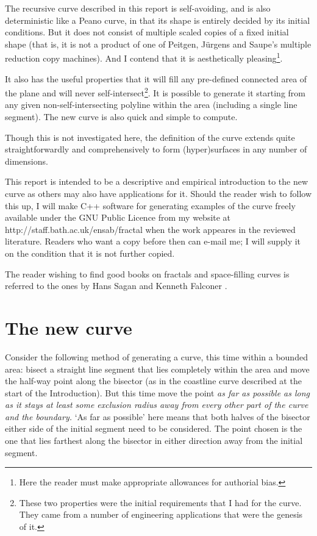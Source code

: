 \documentclass[12pt]{article}
\begin{document}
The recursive curve described in this report is self-avoiding, and is
also deterministic like a Peano curve, in that its shape is entirely
decided by its initial conditions.  But it does not consist of
multiple scaled copies of a fixed initial shape (that is, it is not a
product of one of Peitgen, J\"{u}rgens and Saupe's multiple
reduction copy machines).  And I contend that it is aesthetically
pleasing\footnote{Here the reader must make appropriate allowances for
authorial bias.}.

It also has the useful properties that it will fill any pre-defined
connected area of the plane and will never
self-intersect\footnote{These two properties were the initial
requirements that I had for the curve.  They came from a number of
engineering applications that were the genesis of it.}.  It is
possible to generate it starting from any given non-self-intersecting
polyline within the area (including a single line
segment).  The new curve is also quick and simple to compute.

Though this is not investigated here, the definition of the curve
extends quite straightforwardly and comprehensively to form
(hyper)surfaces in any number of dimensions.

This report is intended to be a descriptive and empirical introduction
to the new curve as others may also have applications for it.  Should
the reader wish to follow this up, I will make C++ software for
generating examples of the curve freely available under the GNU Public
Licence \cite{gpl} from my website at
http://staff.bath.ac.uk/ensab/fractal when the work appeares in the
reviewed literature.  Readers who want a copy before then can e-mail
me; I will supply it on the condition that it is not further copied.

The reader wishing to find good books on fractals and space-filling
curves is referred to the ones by Hans Sagan \cite{sagan} and Kenneth
Falconer \cite{falconer}.

\section*{The new curve}

Consider the following method of generating a curve, this time within
a bounded area: bisect a straight line segment that lies completely
within the area and move the half-way point along the bisector (as in
the coastline curve described at the start of the Introduction).  But
this time move the point {\em as far as possible as long as it stays
at least some exclusion radius away from every other part of the curve
and the boundary.}  `As far as possible' here means that both halves
of the bisector either side of the initial segment need to be
considered.  The point chosen is the one that lies farthest along the
bisector in either direction away from the initial segment.
\end{document}
